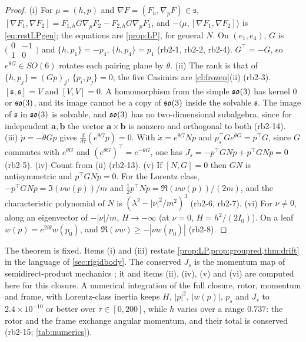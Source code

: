 \begin{proof}
(i) For $\mu=(h,p)$ and $\nabla F=(F_h,\nabla_pF)\in\mathfrak s$, $[\nabla F_1,\nabla F_2]=F_{1,h}G\nabla_pF_2-F_{2,h}G\nabla_pF_1$, and
$-\langle\mu,[\nabla F_1,\nabla F_2]\rangle$ is \eqref{eq:restLPgen}; the equations are \cref{prop:LP}, for general $N$. On $(e_1,e_4)$, $G$ is
$\bigl(\begin{smallmatrix}0&-1\\1&0\end{smallmatrix}\bigr)$ and $\{h,p_1\}=-p_4$, $\{h,p_4\}=p_1$ (rb2-1, rb2-2, rb2-4). $G^{\!\top}=-G$, so
$e^{\theta G}\in SO(6)$ rotates each pairing plane by $\theta$. (ii) The rank is that of $\{h,p_j\}=(Gp)_j$, $\{p_i,p_j\}=0$; the five Casimirs are
\cref{cl:frozen}(ii) (rb2-3). $[\mathfrak s,\mathfrak s]=V$ and $[V,V]=0$. A homomorphism from the simple $\mathfrak{so}(3)$ has kernel $0$ or $\mathfrak{so}(3)$, and
its image cannot be a copy of $\mathfrak{so}(3)$ inside the solvable $\mathfrak s$. The image of $\mathfrak s$ in $\mathfrak{so}(3)$ is solvable, and $\mathfrak{so}(3)$ has no
two-dimensional subalgebra, since for independent $\mathbf a,\mathbf b$ the vector $\mathbf a\times\mathbf b$ is nonzero and orthogonal to both (rb2-14).
(iii) $\dot p=-\dot\theta Gp$ gives $\tfrac{d}{d\tau}(e^{\theta G}p)=0$. With $\dot x=e^{\theta G}Np$ and $p_s^{\!\top}Ge^{\theta G}=p^{\!\top}G$, since $G$
commutes with $e^{\theta G}$ and $(e^{\theta G})^{\!\top}=e^{-\theta G}$, one has $\dot J_s=-p^{\!\top}GNp+p^{\!\top}GNp=0$ (rb2-5). (iv) Count from (ii)
(rb2-13). (v) If $[N,G]=0$ then $GN$ is antisymmetric and $p^{\!\top}GNp=0$. For the Lorentz class, $-p^{\!\top}GNp=\Im(\nu w(p))/m$ and
$\tfrac12p^{\!\top}Np=\Re(\nu w(p))/(2m)$, and the characteristic polynomial of $N$ is $(\lambda^2-|\nu|^2/m^2)^3$ (rb2-6, rb2-7). (vi) For $\nu\neq0$, along an
eigenvector of $-|\nu|/m$, $H\to-\infty$ (at $\nu=0$, $H=h^2/(2I_0)$). On a leaf $w(p)=e^{2i\theta}w(p_0)$, and $\Re(\nu w)\ge-|\nu w(p_0)|$ (rb2-8).
\end{proof}

The theorem is fixed. Items (i) and (iii) restate \cref{prop:LP,prop:groupred,thm:drift} in the language of \cref{sec:rigidbody}. The conserved $J_s$ is the momentum map
of semidirect-product mechanics \cite{HolmMarsdenRatiu98,MarsdenRatiu99}; it and items (ii), (iv), (v) and (vi) are computed here for this closure. A numerical integration of the full closure, rotor, momentum and
frame, with Lorentz-class inertia keeps $H$, $|p|^2$, $|w(p)|$, $p_s$ and $J_s$ to $2.4\times10^{-10}$ or better over $\tau\in[0,200]$, while $h$
varies over a range $0.737$: the rotor and the frame exchange angular momentum, and their total is conserved (rb2-15; \cref{tab:numerics}).

